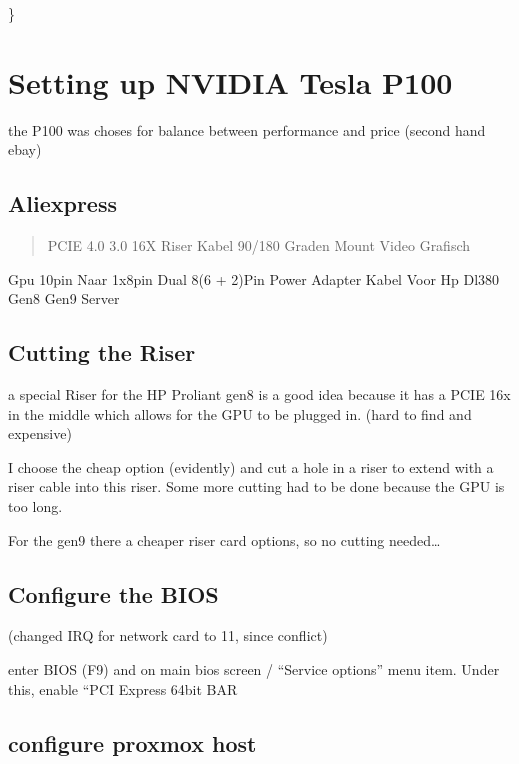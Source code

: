 \documentclass[letterpaper,10pt,english]{sphinxmanual}
\begin{document}
\sphinxAtStartPar
\}

\sphinxstepscope


\chapter{Setting up NVIDIA Tesla P100}
\label{\detokenize{NVIDIA:setting-up-nvidia-tesla-p100}}\label{\detokenize{NVIDIA::doc}}
\sphinxAtStartPar
the P100 was choses for balance between performance and price (second hand ebay)


\section{Aliexpress}
\label{\detokenize{NVIDIA:aliexpress}}\begin{quote}

\sphinxAtStartPar
PCIE 4.0 3.0 16X Riser Kabel 90/180 Graden Mount Video Grafisch
\end{quote}

\sphinxAtStartPar
Gpu 10pin Naar 1x8pin Dual 8(6 + 2)Pin Power Adapter Kabel Voor Hp Dl380 Gen8 Gen9 Server


\section{Cutting the Riser}
\label{\detokenize{NVIDIA:cutting-the-riser}}
\sphinxAtStartPar
a special Riser for the HP Proliant gen8 is a good idea because it has a PCIE 16x in the middle which allows for the GPU  to be plugged in. (hard to find and expensive)

\sphinxAtStartPar
I choose the cheap option (evidently) and cut a hole in a riser to extend with a riser cable into this riser. Some more cutting had to be done because the GPU is too long.

\sphinxAtStartPar
For the gen9 there a cheaper riser card options, so no cutting needed…


\section{Configure the BIOS}
\label{\detokenize{NVIDIA:configure-the-bios}}
\sphinxAtStartPar
(changed IRQ for network card to 11, since conflict)

\sphinxAtStartPar
enter BIOS (F9) and on main bios screen / “Service options” menu item. Under this, enable “PCI Express 64\sphinxhyphen{}bit BAR


\section{configure proxmox host}
\label{\detokenize{NVIDIA:configure-proxmox-host}}
\sphinxAtStartPar
{}
\end{document}
